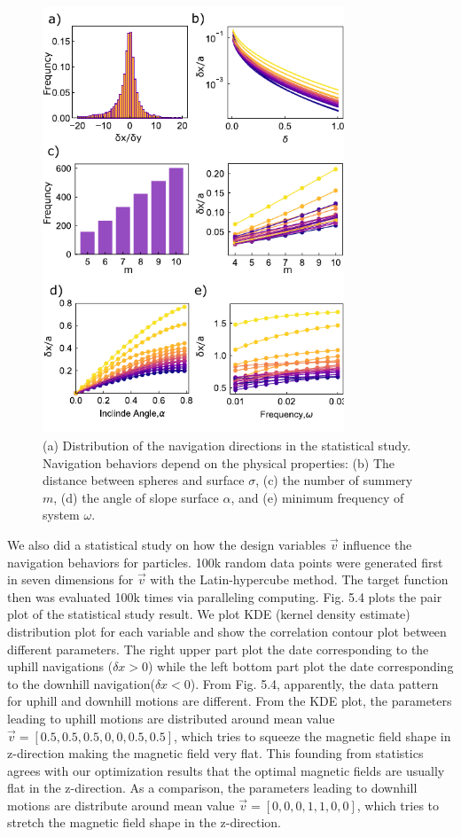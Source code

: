 \begin{figure}[p]
\centering
\includegraphics[width=9cm]{figures/5_5.pdf}
\caption{(a) Distribution of the navigation directions in the statistical study. Navigation behaviors depend on the physical properties: (b) The distance between spheres and surface $\sigma$, (c) the number of summery $m$, (d) the angle of slope surface $\alpha$, and (e) minimum frequency of system  $\omega$. }
\label{fig:5.5}
\end{figure}


We also did a statistical study on how the design variables $\vec{v}$ influence the  navigation behaviors for particles. 100k random data points were generated first in seven dimensions for $\vec{v}$ with the Latin-hypercube method\autocite{park1994optimal}. The target function then was evaluated 100k times via paralleling computing. Fig. 5.4 plots the pair plot of the statistical study result. We plot KDE (kernel density estimate) distribution plot for each variable and show the correlation contour plot between different parameters. The right upper part plot the date corresponding to the uphill navigations ($\delta x>0$) while the left bottom part plot the date corresponding to the downhill navigation($\delta x<0$). From Fig. 5.4, apparently, the data pattern for uphill and downhill motions are different. From the KDE plot, the parameters leading to uphill motions are distributed around mean value $\vec{v}=[0.5,0.5,0.5,0,0,0.5,0.5]$, which tries to squeeze the magnetic field shape in z-direction making the magnetic field  very flat. This founding from statistics agrees with our optimization results that the optimal magnetic fields are usually flat in the z-direction. As a comparison, the parameters leading to downhill motions are distribute around mean value $\vec{v}=[0,0,0,1,1,0,0]$, which tries to 
stretch the magnetic field shape in the z-direction.
 
